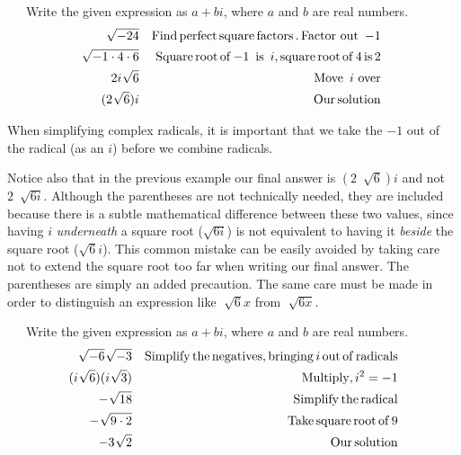 \begin{example}~~~Write the given expression as $a+bi$, where $a$ and $b$ are real numbers.
  \begin{eqnarray*}
    \sqrt[]{- 24} &  & \operatorname{Find} \operatorname{perfect} \operatorname{square}
    \operatorname{factors}. \operatorname{Factor~out~} - 1\\
    \sqrt[]{- 1 \cdot 4 \cdot 6} &  & \operatorname{Square} \operatorname{root} \operatorname{of} - 1
    \operatorname{~is~} i, \operatorname{square} \operatorname{root} \operatorname{of} 4 \operatorname{is} 2\\
    2 i~\sqrt[]{6} &  & \operatorname{Move~} i \text{~over}\\
    (2 ~\sqrt[]{6})i &  & \operatorname{Our} \operatorname{solution}
	\end{eqnarray*}
\end{example}
When simplifying complex radicals, it is important that we take the $- 1$ out
of the radical (as an $i$) before we combine radicals.\pp

Notice also that in the previous example our final answer is $(2 ~\sqrt[]{6})i$ and not $2 ~\sqrt[]{6i}$.  Although the parentheses are not technically needed, they are included because there is a subtle mathematical difference between these two values, since having $i$ \textit{underneath} a square root ($\sqrt{6i}$) is not equivalent to having it \textit{beside} the square root ($\sqrt{6}i$).  This common mistake can be easily avoided by taking care not to extend the square root too far when writing our final answer.  The parentheses are simply an added precaution.  The same care must be made in order to distinguish an expression like $\sqrt[]{6}x$ from $\sqrt[]{6x}$.

\begin{example}~~~Write the given expression as $a+bi$, where $a$ and $b$ are real numbers.
  \begin{eqnarray*}
    \sqrt[]{- 6} ~\sqrt[]{- 3} &  & \operatorname{Simplify} \operatorname{the}
    \operatorname{negatives}, \operatorname{bringing} i \operatorname{out} \operatorname{of} \operatorname{radicals}\\
    (i ~\sqrt[]{6}) (i ~\sqrt[]{3}) &  & \operatorname{Multiply,}
    i^2 = - 1\\
    - ~\sqrt[]{18} &  & \operatorname{Simplify} \operatorname{the} \operatorname{radical}\\
    - ~\sqrt[]{9 \cdot 2} &  & \operatorname{Take} \operatorname{square} \operatorname{root} \operatorname{of}
    9\\
    - 3 ~\sqrt[]{2} &  & \operatorname{Our} \operatorname{solution}
  \end{eqnarray*}
\end{example}

